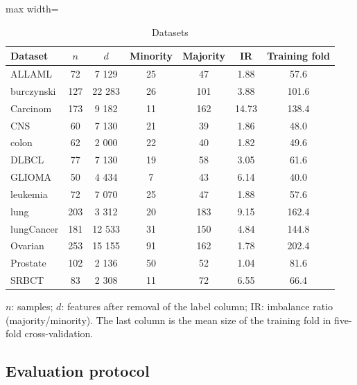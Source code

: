 \documentclass[conference]{IEEEtran}
\begin{document}
\begin{table}[!t]
\centering
\footnotesize
\caption{Datasets}
\label{tab:2}
\setlength{\tabcolsep}{3.5pt}
\begin{adjustbox}{max width=\linewidth}
\begin{tabular}{lcccccc}
\hline
Dataset & $n$ & $d$ & Minority & Majority & IR & Training fold \\
\hline
ALLAML & 72 & 7 129 & 25 & 47 & 1.88 & 57.6 \\
burczynski & 127 & 22 283 & 26 & 101 & 3.88 & 101.6 \\
Carcinom & 173 & 9 182 & 11 & 162 & 14.73 & 138.4 \\
CNS & 60 & 7 130 & 21 & 39 & 1.86 & 48.0 \\
colon & 62 & 2 000 & 22 & 40 & 1.82 & 49.6 \\
DLBCL & 77 & 7 130 & 19 & 58 & 3.05 & 61.6 \\
GLIOMA & 50 & 4 434 & 7 & 43 & 6.14 & 40.0 \\
leukemia & 72 & 7 070 & 25 & 47 & 1.88 & 57.6 \\
lung & 203 & 3 312 & 20 & 183 & 9.15 & 162.4 \\
lungCancer & 181 & 12 533 & 31 & 150 & 4.84 & 144.8 \\
Ovarian & 253 & 15 155 & 91 & 162 & 1.78 & 202.4 \\
Prostate & 102 & 2 136 & 50 & 52 & 1.04 & 81.6 \\
SRBCT & 83 & 2 308 & 11 & 72 & 6.55 & 66.4 \\
\hline
\end{tabular}
\end{adjustbox}
\par\vspace{3pt}
\begin{minipage}{\linewidth}\scriptsize $n$: samples; $d$: features after removal of the label column; IR: imbalance ratio (majority/minority). The last column is the mean size of the training fold in five-fold cross-validation.\end{minipage}
\end{table}

\subsection{Evaluation protocol}\label{sec:evaluation-protocol}
\end{document}
